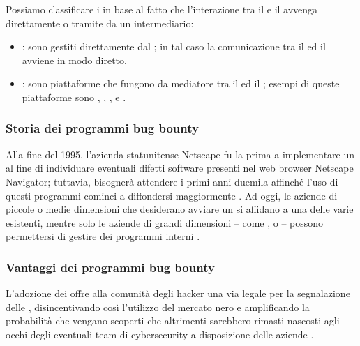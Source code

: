 
Possiamo classificare i \BBP in base al fatto che l'interazione tra il \BI e il \BH avvenga direttamente o tramite da un intermediario:

\begin{itemize}

\item \InternalBBP: sono \BBP gestiti direttamente dal \BI \cite{hoffman2021bountychain}; in tal caso la comunicazione tra il \BI ed il \BH avviene in modo diretto.

\item \BugBountyPlatform: sono piattaforme che fungono da mediatore tra il \BI ed il \BH \cite{hoffman2021bountychain}; 
esempi di queste piattaforme sono \HackerOne, \Intigriti, \Bugcrowd, \Synack e \Yogosha \cite{walshe2023bountythesis3, walshe2020bountypaper}. 

\end{itemize}

\subsubsection{Storia dei programmi bug bounty}

Alla fine del 1995, l'azienda statunitense Netscape fu la prima a implementare un \BBP al fine di individuare eventuali difetti software presenti nel web browser Netscape Navigator; tuttavia, bisognerà attendere i primi anni duemila affinché l'uso di questi programmi cominci a diffondersi maggiormente \cite{hoffman2021bountychain}.
Ad oggi, le aziende di piccole o medie dimensioni che desiderano avviare un \BBP si affidano a una delle varie \bugbountyplatform esistenti, mentre solo le aziende di grandi dimensioni -- come \GoogleBBP, \MetaBBP o {\MicrosoftBBP} -- possono permettersi di gestire dei programmi interni \cite{walshe2023bountythesis3}.

\subsubsection{Vantaggi dei programmi bug bounty}

L'adozione dei \BBP offre alla comunità degli hacker una via legale per la segnalazione delle \vulnerability, disincentivando così l'utilizzo del mercato nero \cite{fryer2017bugbounty, walshe2020bountypaper, walshe2023bountythesis3} e  amplificando la probabilità che vengano scoperti \bug che altrimenti sarebbero rimasti nascosti agli occhi degli eventuali team di cybersecurity a disposizione delle aziende \cite{walshe2020bountypaper}.

